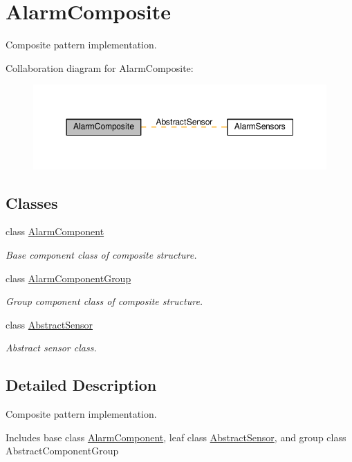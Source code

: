 \hypertarget{group__AlarmComposite}{}\section{Alarm\+Composite}
\label{group__AlarmComposite}


Composite pattern implementation.  


Collaboration diagram for Alarm\+Composite\+:\nopagebreak
\begin{figure}[H]
\begin{center}
\leavevmode
\includegraphics[width=350pt]{group__AlarmComposite}
\end{center}
\end{figure}
\subsection*{Classes}
\begin{DoxyCompactItemize}
\item 
class \hyperlink{classAlarmComponent}{Alarm\+Component}
\begin{DoxyCompactList}\small\item\em Base component class of composite structure. \end{DoxyCompactList}\item 
class \hyperlink{classAlarmComponentGroup}{Alarm\+Component\+Group}
\begin{DoxyCompactList}\small\item\em Group component class of composite structure. \end{DoxyCompactList}\item 
class \hyperlink{classAbstractSensor}{Abstract\+Sensor}
\begin{DoxyCompactList}\small\item\em Abstract sensor class. \end{DoxyCompactList}\end{DoxyCompactItemize}


\subsection{Detailed Description}
Composite pattern implementation. 

Includes base class \hyperlink{classAlarmComponent}{Alarm\+Component}, leaf class \hyperlink{classAbstractSensor}{Abstract\+Sensor}, and group class Abstract\+Component\+Group 